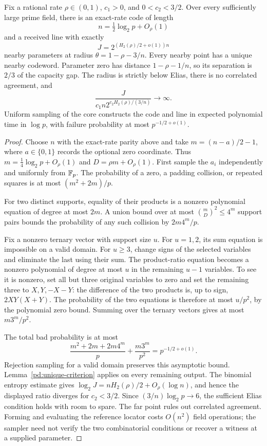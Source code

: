 \begin{theorem}
\label{pd:unique}
Fix a rational rate $\rho\in(0,1)$, $c_1>0$, and $0<c_2<3/2$.
Over every sufficiently large prime field, there is an exact-rate code
of length
\[
 n=\tfrac12\log_2p+O_\rho(1)
\]
and a received line with exactly
\[
 J=2^{(H_2(\rho)/2+o(1))n}
\]
nearby parameters at radius $\theta=1-\rho-3/n$. Every nearby point
has a unique nearby codeword. Parameter zero has distance
$1-\rho-1/n$, so its separation is $2/3$ of the capacity gap.
The radius is strictly below Elias, there is no correlated agreement,
and
\[
 \frac{J}{c_1n2^{c_2H_2(\rho)/(3/n)}}\longrightarrow\infty.
\]
Uniform sampling of the core constructs the code and line in expected
polynomial time in $\log p$, with failure probability
at most $p^{-1/2+o(1)}$.
\end{theorem}
\begin{proof}
Choose $n$ with the exact-rate parity above and take
$m=(n-a)/2-1$, where $a\in\{0,1\}$ records the optional zero coordinate.
Thus $m=\tfrac14\log_2p+O_\rho(1)$ and
$D=\rho m+O_\rho(1)$. First sample the $a_i$ independently and uniformly
from $\mathbb F_p$. The probability of a zero, a padding collision, or repeated
squares is at most $(m^2+2m)/p$.

For two distinct supports, equality of their products is a nonzero
polynomial equation of degree at most $2m$. A union bound over at most
$\binom mD^2\le4^m$ support pairs bounds the probability of any such
collision by $2m4^m/p$.

Fix a nonzero ternary vector with support size $u$. For $u=1,2$, its
sum equation is impossible on a valid domain. For $u\ge3$, change signs
of the selected variables and eliminate the last using their sum.
The product-ratio equation becomes a nonzero polynomial of degree at
most $u$ in the remaining $u-1$ variables. To see it is nonzero, set
all but three original variables to zero and set the remaining three
to $X,Y,-X-Y$: the difference of the two products is, up to sign,
$2XY(X+Y)$. The probability of the two equations is therefore at most
$u/p^2$, by the polynomial zero bound. Summing over the ternary vectors
gives at most $m3^m/p^2$.

The total bad probability is at most
\[
 \frac{m^2+2m+2m4^m}{p}+\frac{m3^m}{p^2}
 =p^{-1/2+o(1)}.
\]
Rejection sampling for a valid domain preserves this asymptotic bound.
Lemma~\ref{pd:unique-criterion} applies on every remaining output.
The binomial entropy estimate gives
$\log_2J=nH_2(\rho)/2+O_\rho(\log n)$, and hence the displayed ratio
diverges for $c_2<3/2$. Since $(3/n)\log_2p\to6$, the sufficient
Elias condition holds with room to spare. The far point rules out
correlated agreement. Forming and evaluating the reference locator
costs $O(n^2)$ field operations; the sampler need not verify the two
combinatorial conditions or recover a witness at a supplied parameter.
\end{proof}
